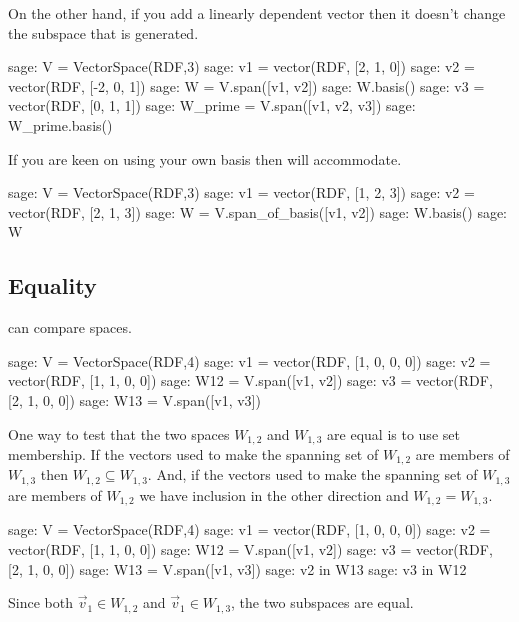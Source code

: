 On the other hand, if you add a linearly dependent vector then
it doesn't change the subspace that is generated.
\begin{sagecommandline}
sage: V = VectorSpace(RDF,3)               
sage: v1 = vector(RDF, [2, 1, 0]) 
sage: v2 = vector(RDF, [-2, 0, 1]) 
sage: W = V.span([v1, v2])       
sage: W.basis()
sage: v3 = vector(RDF, [0, 1, 1])
sage: W_prime = V.span([v1, v2, v3])
sage: W_prime.basis()
\end{sagecommandline}

If you are keen on using your own basis then \Sage{} will
accommodate.
\begin{sagecommandline}
sage: V = VectorSpace(RDF,3)
sage: v1 = vector(RDF, [1, 2, 3])
sage: v2 = vector(RDF, [2, 1, 3])
sage: W = V.span_of_basis([v1, v2])
sage: W.basis()
sage: W
\end{sagecommandline}




\subsection{Equality}

\Sage{} can compare spaces.
\begin{sagecommandline}
sage: V = VectorSpace(RDF,4)
sage: v1 = vector(RDF, [1, 0, 0, 0])
sage: v2 = vector(RDF, [1, 1, 0, 0])
sage: W12 = V.span([v1, v2])
sage: v3 = vector(RDF, [2, 1, 0, 0])
sage: W13 = V.span([v1, v3])  
\end{sagecommandline}
One way to test that the two spaces $W_{1,2}$ and $W_{1,3}$ 
are equal is to use set membership.
If the vectors used to make the spanning set of  $W_{1,2}$ are 
members of  $W_{1,3}$ then  $W_{1,2}\subseteq W_{1,3}$.
And, if the vectors used to make the spanning set of  $W_{1,3}$ are 
members of  $W_{1,2}$ we have inclusion in the other direction and 
$W_{1,2}=W_{1,3}$.
\begin{sagecommandline}
sage: V = VectorSpace(RDF,4)
sage: v1 = vector(RDF, [1, 0, 0, 0])
sage: v2 = vector(RDF, [1, 1, 0, 0])
sage: W12 = V.span([v1, v2])
sage: v3 = vector(RDF, [2, 1, 0, 0])
sage: W13 = V.span([v1, v3])  
sage: v2 in W13
sage: v3 in W12
\end{sagecommandline}
Since both $\vec{v}_1\in W_{1,2}$ and $\vec{v}_1\in W_{1,3}$, the
two subspaces are equal.

